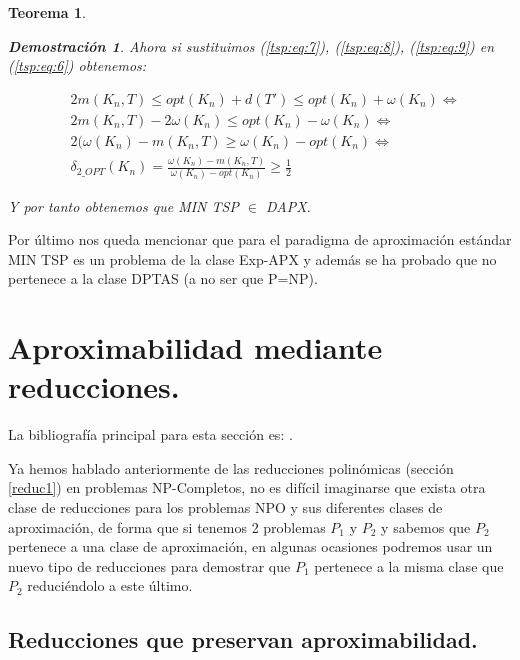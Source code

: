 \documentclass[a4paper,12pt,titlepage]{article}
\newtheorem{teo}{Teorema}[section]
\newtheorem*{dem}{\textbf{Demostraci\'on}}
\begin{document}
\begin{teo}
\begin{dem}
Ahora si sustituimos (\ref{tsp:eq:7}), (\ref{tsp:eq:8}), (\ref{tsp:eq:9}) en (\ref{tsp:eq:6}) obtenemos:

\begin{equation} \label{tsp:eq:10}
\begin{split}
& 2m(K_n,T) \leq opt(K_n) + d(T') \leq opt(K_n) + \omega(K_n) \Leftrightarrow \\ & 2m(K_n,T) - 2\omega(K_n) \leq opt(K_n) - \omega(K_n) \Leftrightarrow \\ & 2(\omega(K_n) - m(K_n,T) \geq \omega(K_n) - opt(K_n) \Leftrightarrow \\ & \delta_{2\_OPT}(K_n) = \frac{\omega(K_n) - m(K_n,T)}{\omega(K_n) - opt(K_n)} \geq \frac{1}{2}
\end{split}
\end{equation}

Y por tanto obtenemos que MIN TSP $\in$ DAPX.

\end{dem}
\end{teo}

Por \'ultimo nos queda mencionar que para el paradigma de aproximaci\'on est\'andar MIN TSP es un problema de la clase Exp-APX \cite{approx_core} y adem\'as se ha probado que no pertenece a la clase DPTAS (a no ser que P=NP)\cite{TSP2}.

\newpage

\section{Aproximabilidad mediante reducciones.}
\label{sec:reduc}

La bibliograf\'ia principal para esta secci\'on es: \cite{approx_core}.

\vspace{0.3cm}

Ya hemos hablado anteriormente de las reducciones polin\'omicas (secci\'on \ref{reduc1}) en problemas NP-Completos, no es dif\'icil imaginarse que exista otra clase de reducciones para los problemas NPO y sus diferentes clases de aproximaci\'on, de forma que si tenemos 2 problemas $P_1$ y $P_2$ y sabemos que $P_2$ pertenece a una clase de aproximaci\'on, en algunas ocasiones podremos usar un nuevo tipo de reducciones para demostrar que $P_1$ pertenece a la misma clase que $P_2$ reduci\'endolo a este \'ultimo.

\subsection{Reducciones que preservan aproximabilidad.}
\end{document}
